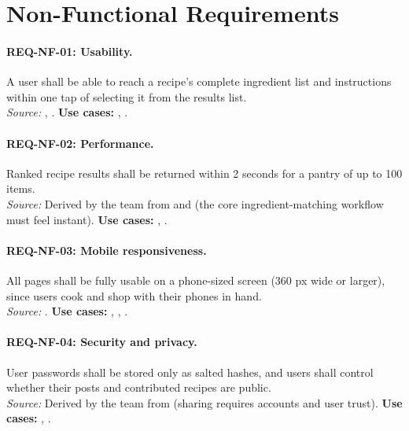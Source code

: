\section{Non-Functional Requirements}

\paragraph{REQ-NF-01: Usability.}
 A user shall be able to reach a recipe's complete ingredient list and instructions within one tap of selecting it from the results list.\\
\textit{Source:} , . \textbf{Use cases:} , .

\paragraph{REQ-NF-02: Performance.}
 Ranked recipe results shall be returned within 2 seconds for a pantry of up to 100 items.\\
\textit{Source:} Derived by the team from  and  (the core ingredient-matching workflow must feel instant). \textbf{Use cases:} , .

\paragraph{REQ-NF-03: Mobile responsiveness.}
 All pages shall be fully usable on a phone-sized screen (360 px wide or larger), since users cook and shop with their phones in hand.\\
\textit{Source:} . \textbf{Use cases:} , , .

\paragraph{REQ-NF-04: Security and privacy.}
 User passwords shall be stored only as salted hashes, and users shall control whether their posts and contributed recipes are public.\\
\textit{Source:} Derived by the team from  (sharing requires accounts and user trust). \textbf{Use cases:} , .

